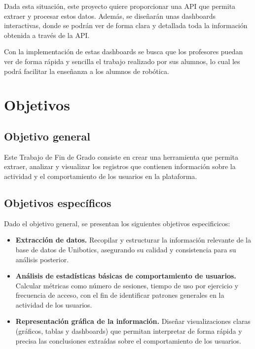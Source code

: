 \documentclass[a4paper, 12pt]{book}
\begin{document}
Dada esta situación, este proyecto quiere proporcionar una API que permita extraer y procesar estos datos. Además, se diseñarán unas dashboards interactivas, donde se podrán ver de forma clara y detallada toda la información obtenida a través de la API.

Con la implementación de estas dashboards se busca que los profesores puedan ver de forma rápida y sencilla el trabajo realizado por sus alumnos, lo cual les podrá facilitar la enseñanza a los alumnos de robótica.

\section{Objetivos}
\label{sec:seccion}

\subsection{Objetivo general} %
\label{sec:objetivo-general} %

Este Trabajo de Fin de Grado consiste en crear una herramienta que permita extraer, analizar y visualizar los registros que contienen información sobre la actividad y el comportamiento de los usuarios en la plataforma.

\subsection{Objetivos específicos}
\label{sec:objetivos-especificos}

Dado el objetivo general, se presentan los siguientes objetivos especificicos:

\begin{itemize}
    \item \textbf{Extracción de datos.} Recopilar y estructurar la información relevante de la base de datos de Unibotics, asegurando su calidad y consistencia para su análisis posterior.
    \item \textbf{Análisis de estadísticas básicas de comportamiento de usuarios.} Calcular métricas como número de sesiones, tiempo de uso por ejercicio y frecuencia de acceso, con el fin de identificar patrones generales en la actividad de los usuarios.
    \item \textbf{Representación gráfica de la información.} Diseñar visualizaciones claras (gráficos, tablas y dashboards) que permitan interpretar de forma rápida y precisa las conclusiones extraídas sobre el comportamiento de los usuarios.
\end{itemize}
\end{document}
